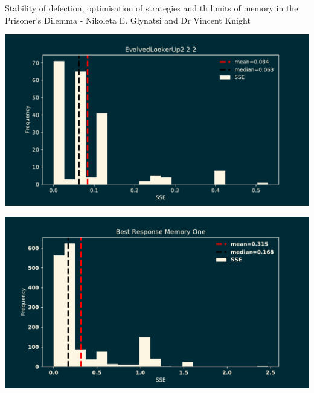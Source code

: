 \documentclass{beamer}
\begin{document}
\begin{frame}
    \begin{center}
        \vspace{-1cm}
        \normalsize{Stability of defection, optimisation of strategies and th
        limits of memory in the Prisoner's Dilemma - Nikoleta E. Glynatsi and
        Dr Vincent Knight}
        
        \vspace{.5cm}
        
    \end{center}
\end{frame}

\begin{frame}
    \begin{center}
        \vspace{-1cm}
        \includegraphics[width=\textwidth]{static/sse_top_strategy}
    \end{center}
\end{frame}

\begin{frame}
    \begin{center}
        \vspace{-1cm}
        \includegraphics[width=\textwidth]{static/result_best_response}
    \end{center}
\end{frame}
\end{document}
